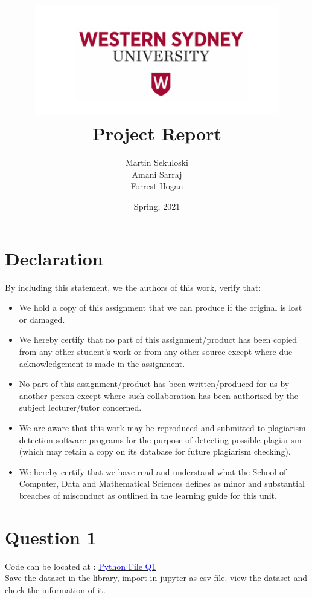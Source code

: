 \documentclass[11pt,a4paper]{scrartcl}
\title{
\includegraphics[height=5cm,width=0.8\textwidth]{westernsydney_logo.PNG}\\
Project Report}
\author{
	Martin Sekuloski\\
	Amani Sarraj\\
	Forrest Hogan}
\affil{Assignment 1 for 301034 Predictive Modelling}
\affil{School of Computer, Data and Mathematical Sciences, \\ Western Sydney University}
\date{Spring, 2021}
\begin{document}
\maketitle


\newpage

\section*{Declaration}

By including this statement, we the authors of this work, verify that:
\begin{itemize}
	\item We hold a copy of this assignment that we can produce if the original is lost or damaged.
	\item We hereby certify that no part of this assignment/product has been copied from any other student’s work or from any other source except where due acknowledgement is made in the assignment.
	\item No part of this assignment/product has been written/produced for us by another person except where such collaboration has been authorised by the subject lecturer/tutor concerned.
	\item We are aware that this work may be reproduced and submitted to plagiarism detection software programs for the purpose of detecting possible plagiarism (which may retain a copy on its database for future plagiarism checking).
	\item We hereby certify that we have read and understand what the School of Computer, Data and Mathematical Sciences defines as minor and substantial breaches of misconduct as outlined in the learning guide for this unit.
\end{itemize}


\newpage

\section{Question 1}
Code can be located at :  \href{https://github.com/MS19393924/Assignment-1-Group-9/blob/8bc1cdcf89aecd67f765e19b0435afb995805ea6/Amani_18831506.py}{\textcolor{blue}{Python File Q1}} \\
Save the dataset in the library, import in jupyter as csv file. view the dataset and check the information of it.\\
\end{document}
